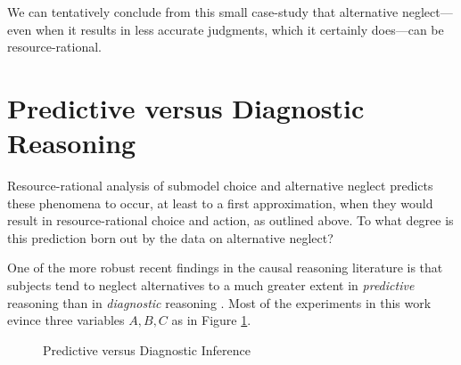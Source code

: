 \documentclass[10pt,letterpaper]{article}
\begin{document}
We can tentatively conclude from this small case-study that alternative neglect---even when it results in less accurate judgments, which it certainly does---can be resource-rational. 

\section{Predictive versus Diagnostic Reasoning}

Resource-rational analysis of submodel choice and alternative neglect predicts these phenomena to occur, at least to a first approximation, when they would result in resource-rational choice and action, as outlined above. To what degree is this prediction born out by the data on alternative neglect?

One of the more robust recent findings in the causal reasoning literature is that subjects tend to neglect alternatives to a much greater extent in \emph{predictive} reasoning than in \emph{diagnostic} reasoning \citep{Fernbach2011,Fernbach2013}. Most of the experiments in this work evince three variables $A,B,C$ as in Figure \ref{diagnostic}.
\begin{figure}[h] \begin{center}
\hspace{.7in}
   \end{center}
 \caption{Predictive versus Diagnostic Inference} \label{diagnostic}
\end{figure}
\end{document}
